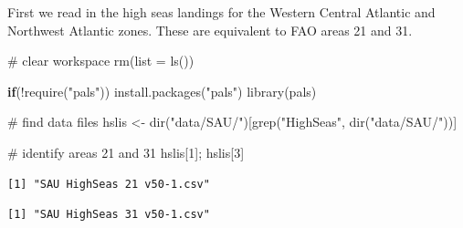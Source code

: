 \documentclass[
  letterpaper,
  oneside,
  open=any]{scrbook}
\newenvironment{Shaded}{\begin{snugshade}}{\end{snugshade}}
\newcommand{\AttributeTok}[1]{\textcolor[rgb]{0.40,0.45,0.13}{#1}}
\newcommand{\CommentTok}[1]{\textcolor[rgb]{0.37,0.37,0.37}{#1}}
\newcommand{\ControlFlowTok}[1]{\textcolor[rgb]{0.00,0.23,0.31}{\textbf{#1}}}
\newcommand{\DecValTok}[1]{\textcolor[rgb]{0.68,0.00,0.00}{#1}}
\newcommand{\FunctionTok}[1]{\textcolor[rgb]{0.28,0.35,0.67}{#1}}
\newcommand{\NormalTok}[1]{\textcolor[rgb]{0.00,0.23,0.31}{#1}}
\newcommand{\OtherTok}[1]{\textcolor[rgb]{0.00,0.23,0.31}{#1}}
\newcommand{\SpecialCharTok}[1]{\textcolor[rgb]{0.37,0.37,0.37}{#1}}
\newcommand{\StringTok}[1]{\textcolor[rgb]{0.13,0.47,0.30}{#1}}
\begin{document}
First we read in the high seas landings for the Western Central Atlantic
and Northwest Atlantic zones. These are equivalent to FAO areas 21 and
31.

\begin{Shaded}
\begin{Highlighting}[]
\CommentTok{\# clear workspace}
\FunctionTok{rm}\NormalTok{(}\AttributeTok{list =} \FunctionTok{ls}\NormalTok{())}

\ControlFlowTok{if}\NormalTok{(}\SpecialCharTok{!}\FunctionTok{require}\NormalTok{(}\StringTok{"pals"}\NormalTok{)) }\FunctionTok{install.packages}\NormalTok{(}\StringTok{"pals"}\NormalTok{)}
\FunctionTok{library}\NormalTok{(pals)}

\CommentTok{\# find data files}
\NormalTok{hslis }\OtherTok{\textless{}{-}} \FunctionTok{dir}\NormalTok{(}\StringTok{"data/SAU/"}\NormalTok{)[}\FunctionTok{grep}\NormalTok{(}\StringTok{"HighSeas"}\NormalTok{, }\FunctionTok{dir}\NormalTok{(}\StringTok{"data/SAU/"}\NormalTok{))]}

\CommentTok{\# identify areas 21 and 31}
\NormalTok{hslis[}\DecValTok{1}\NormalTok{]; hslis[}\DecValTok{3}\NormalTok{]   }
\end{Highlighting}
\end{Shaded}

\begin{verbatim}
[1] "SAU HighSeas 21 v50-1.csv"
\end{verbatim}

\begin{verbatim}
[1] "SAU HighSeas 31 v50-1.csv"
\end{verbatim}

\begin{Shaded}
\end{Shaded}
\end{document}
